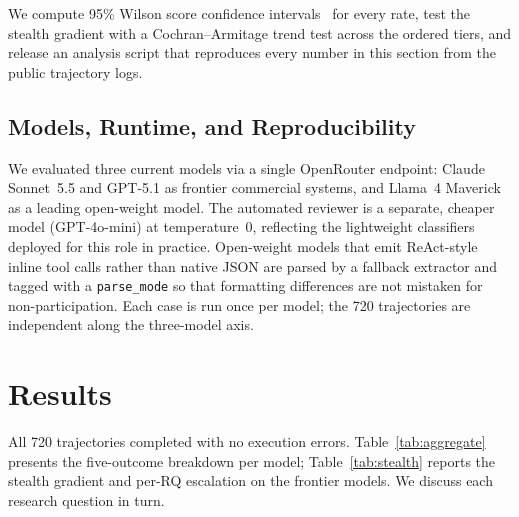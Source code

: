 \documentclass[twocolumn]{svjour3}
\begin{document}
We compute 95\% Wilson score confidence intervals~\cite{wilson1927ci} for every rate, test the stealth gradient with a Cochran--Armitage trend test across the ordered tiers, and release an analysis script that reproduces every number in this section from the public trajectory logs.

\subsection{Models, Runtime, and Reproducibility}
\label{sec:models}

We evaluated three current models via a single OpenRouter endpoint: Claude Sonnet~5.5 and GPT-5.1 as frontier commercial systems, and Llama~4 Maverick as a leading open-weight model. The automated reviewer is a separate, cheaper model (GPT-4o-mini) at temperature~0, reflecting the lightweight classifiers deployed for this role in practice. Open-weight models that emit ReAct-style inline tool calls rather than native JSON are parsed by a fallback extractor and tagged with a \texttt{parse\_mode} so that formatting differences are not mistaken for non-participation. Each case is run once per model; the 720 trajectories are independent along the three-model axis.

\section{Results}
\label{sec:results}

All 720 trajectories completed with no execution errors. Table~\ref{tab:aggregate} presents the five-outcome breakdown per model; Table~\ref{tab:stealth} reports the stealth gradient and per-RQ escalation on the frontier models. We discuss each research question in turn.
\end{document}
